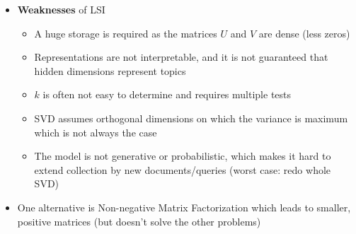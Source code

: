\begin{itemize}
\begin{itemize}
		\item Using $X'$ instead of $X$ show performance increase as we filter out the noise
		\item $X'$ represents the best approximation of $X$ with a matrix of rank $k$: $X' = \argmin\limits_{X':\text{rank}(X')=k} ||X-X'||$
		\item Is mostly combined with lexical methods like BM25 to not lose "obvious" matches
	\end{itemize}
	\item \textbf{Weaknesses} of LSI
	\begin{itemize}
		\item A huge storage is required as the matrices $U$ and $V$ are dense (less zeros)
		\item Representations are not interpretable, and it is not guaranteed that hidden dimensions represent topics
		\item $k$ is often not easy to determine and requires multiple tests
		\item SVD assumes orthogonal dimensions on which the variance is maximum which is not always the case
		\item The model is not generative or probabilistic, which makes it hard to extend collection by new documents/queries (worst case: redo whole SVD)
	\end{itemize}
	\item One alternative is Non-negative Matrix Factorization which leads to smaller, positive matrices (but doesn't solve the other problems)
\end{itemize}
